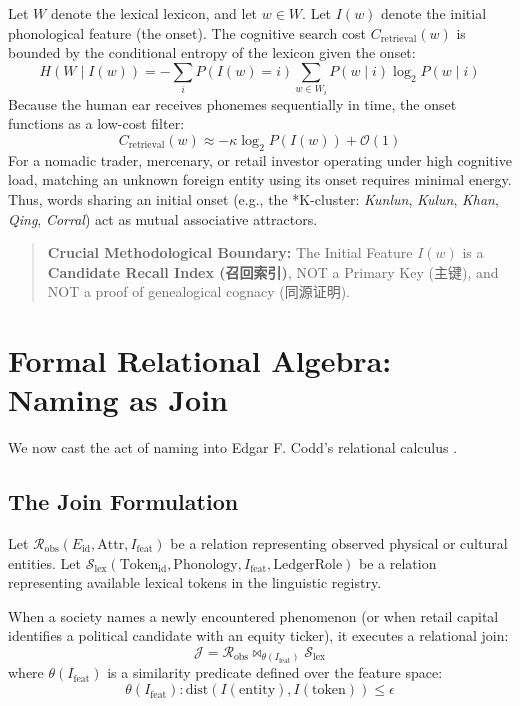 \documentclass[11pt,a4paper]{article}
\begin{document}
Let $W$ denote the lexical lexicon, and let $w \in W$. Let $I(w)$ denote the initial phonological feature (the onset). The cognitive search cost $C_{\text{retrieval}}(w)$ is bounded by the conditional entropy of the lexicon given the onset:
\begin{equation}
    H(W \mid I(w)) = -\sum_{i} P(I(w) = i) \sum_{w \in W_i} P(w \mid i) \log_2 P(w \mid i)
\end{equation}
Because the human ear receives phonemes sequentially in time, the onset functions as a low-cost filter:
\begin{equation}
    C_{\text{retrieval}}(w) \approx -\kappa \log_2 P(I(w)) + \mathcal{O}(1)
\end{equation}
For a nomadic trader, mercenary, or retail investor operating under high cognitive load, matching an unknown foreign entity using its onset requires minimal energy. Thus, words sharing an initial onset (e.g., the *K-cluster: \textit{Kunlun}, \textit{Kulun}, \textit{Khan}, \textit{Qing}, \textit{Corral}) act as mutual associative attractors.

\begin{quote}
\textbf{Crucial Methodological Boundary:} The Initial Feature $I(w)$ is a \textbf{Candidate Recall Index (召回索引)}, NOT a Primary Key (主键), and NOT a proof of genealogical cognacy (同源证明).
\end{quote}

\section{Formal Relational Algebra: Naming as Join}

We now cast the act of naming into Edgar F. Codd's relational calculus \cite{codd1970relational}.

\subsection{The Join Formulation}
Let $\mathcal{R}_{\text{obs}}(E_{\text{id}}, \text{Attr}, I_{\text{feat}})$ be a relation representing observed physical or cultural entities. Let $\mathcal{S}_{\text{lex}}(\text{Token}_{\text{id}}, \text{Phonology}, I_{\text{feat}}, \text{LedgerRole})$ be a relation representing available lexical tokens in the linguistic registry.

When a society names a newly encountered phenomenon (or when retail capital identifies a political candidate with an equity ticker), it executes a relational join:
\begin{equation}
    \mathcal{J} = \mathcal{R}_{\text{obs}} \bowtie_{\theta(I_{\text{feat}})} \mathcal{S}_{\text{lex}}
\end{equation}
where $\theta(I_{\text{feat}})$ is a similarity predicate defined over the feature space:
\begin{equation}
    \theta(I_{\text{feat}}): \text{dist}(I(\text{entity}), I(\text{token})) \le \epsilon
\end{equation}
\end{document}
